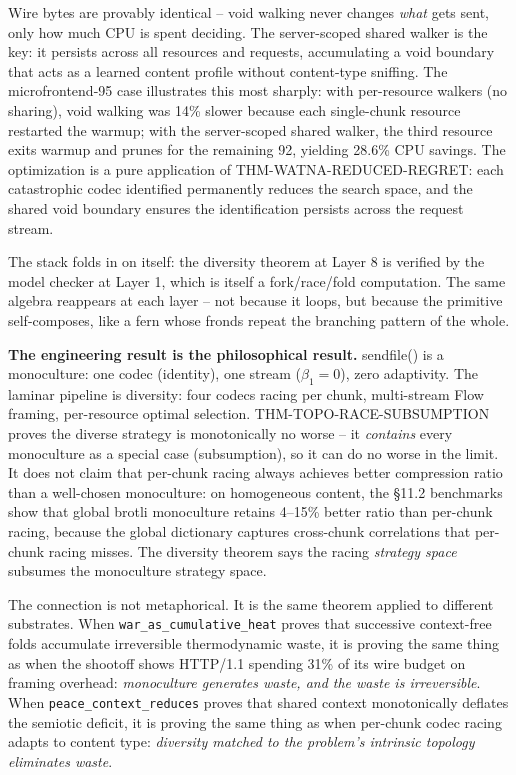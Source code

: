 \documentclass[
  11pt,
]{article}
\begin{document}
Wire bytes are provably identical -- void walking never changes
\emph{what} gets sent, only how much CPU is spent deciding. The
server-scoped shared walker is the key: it persists across all resources
and requests, accumulating a void boundary that acts as a learned
content profile without content-type sniffing. The microfrontend-95 case
illustrates this most sharply: with per-resource walkers (no sharing),
void walking was 14\% slower because each single-chunk resource
restarted the warmup; with the server-scoped shared walker, the third
resource exits warmup and prunes for the remaining 92, yielding 28.6\%
CPU savings. The optimization is a pure application of
THM-WATNA-REDUCED-REGRET: each catastrophic codec identified permanently
reduces the search space, and the shared void boundary ensures the
identification persists across the request stream.

The stack folds in on itself: the diversity theorem at Layer 8 is
verified by the model checker at Layer 1, which is itself a
fork/race/fold computation. The same algebra reappears at each layer --
not because it loops, but because the primitive self-composes, like a
fern whose fronds repeat the branching pattern of the whole.

\textbf{The engineering result is the philosophical result.} sendfile()
is a monoculture: one codec (identity), one stream (\(\beta_1 = 0\)),
zero adaptivity. The laminar pipeline is diversity: four codecs racing
per chunk, multi-stream Flow framing, per-resource optimal selection.
THM-TOPO-RACE-SUBSUMPTION proves the diverse strategy is monotonically
no worse -- it \emph{contains} every monoculture as a special case
(subsumption), so it can do no worse in the limit. It does not claim
that per-chunk racing always achieves better compression ratio than a
well-chosen monoculture: on homogeneous content, the §11.2 benchmarks
show that global brotli monoculture retains 4--15\% better ratio than
per-chunk racing, because the global dictionary captures cross-chunk
correlations that per-chunk racing misses. The diversity theorem says
the racing \emph{strategy space} subsumes the monoculture strategy
space.

The connection is not metaphorical. It is the same theorem applied to
different substrates. When \texttt{war\_as\_cumulative\_heat} proves
that successive context-free folds accumulate irreversible thermodynamic
waste, it is proving the same thing as when the shootoff shows HTTP/1.1
spending 31\% of its wire budget on framing overhead: \emph{monoculture
generates waste, and the waste is irreversible}. When
\texttt{peace\_context\_reduces} proves that shared context
monotonically deflates the semiotic deficit, it is proving the same
thing as when per-chunk codec racing adapts to content type:
\emph{diversity matched to the problem's intrinsic topology eliminates
waste}.
\end{document}
